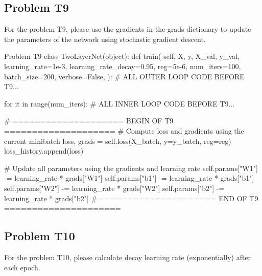 \documentclass[12pt, a4paper]{article}
\begin{document}
    \pagebreak

        \subsection{Problem T9}
            For the problem T9, please use the gradients in the grads dictionary to update the parameters of the network using stochastic gradient descent.

            \begin{codeblock}{Problem T9}
                class TwoLayerNet(object):
                    def train(
                        self, X, y, X_val, y_val,
                        learning_rate=1e-3,
                        learning_rate_decay=0.95,
                        reg=5e-6,
                        num_iters=100,
                        batch_size=200,
                        verbose=False,
                    ):
                        # ALL OUTER LOOP CODE BEFORE T9...

                        for it in range(num_iters):
                            # ALL INNER LOOP CODE BEFORE T9...

                            # ==================== BEGIN OF T9 ====================
                            # Compute loss and gradients using the current minibatch
                            loss, grads = self.loss(X_batch, y=y_batch, reg=reg)
                            loss_history.append(loss)

                            # Update all parameters using the gradients and learning rate
                            self.params["W1"] -= learning_rate * grads["W1"]
                            self.params["b1"] -= learning_rate * grads["b1"]
                            self.params["W2"] -= learning_rate * grads["W2"]
                            self.params["b2"] -= learning_rate * grads["b2"]
                            # ===================== END OF T9 =====================
            \end{codeblock}

    \pagebreak

        \subsection{Problem T10}
            For the problem T10, please calculate decay learning rate (exponentially) after each epoch.
\end{document}
